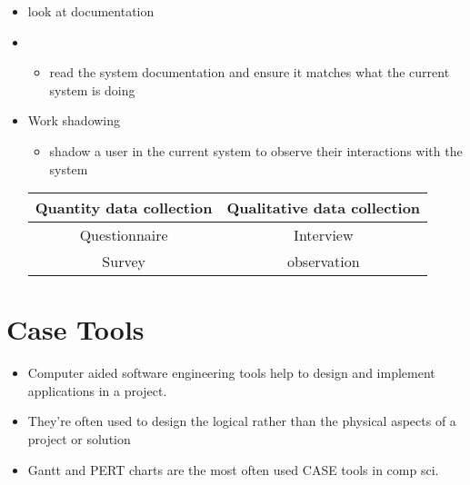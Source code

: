 \documentclass[12pt, a4, twoside]{article}
\begin{document}
\begin{itemize}
    \item look at documentation
    \item \begin{itemize}
      \item read the system documentation and ensure it matches what the current system is doing
    \end{itemize}
    \item Work shadowing
    \begin{itemize}
      \item shadow a user in the current system to observe their interactions with the system
    \end{itemize}
    \begin{center}
      \begin{tabular}{ |c|c| }
        \hline
        {Quantity data collection} & {Qualitative data collection} \\\hline
        {Questionnaire} & {Interview} \\\hline
        {Survey} & {observation}  \\ \hline
      \end{tabular}
    \end{center}
  \end{itemize}

  \section{Case Tools}
  \begin{itemize}
    \item Computer aided software engineering tools help to design and implement applications in a project.
    \item They're often used to design the logical rather than the physical aspects of a project or solution
    \item Gantt and PERT charts are the most often used CASE tools in comp sci.
  \end{itemize}
\end{document}
